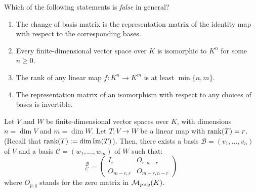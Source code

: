 \begin{exercise}
\label{exc:linear_maps_and_base_changes_sc}
Which of the following statements is \emph{false} in general?
\begin{enumerate}[label=\textbf{(\alph*)}]
    \item The change of basis matrix is the representation matrix of the identity map with respect to the corresponding bases.
    \item Every finite-dimensional vector space over $K$ is isomorphic to $K^n$ for some $n \ge 0$.
    \item The rank of any linear map $f \colon K^n \to K^m$ is at least $\min\{n, m\}$.
    \item The representation matrix of an isomorphism with respect to any choices of bases is invertible.
\end{enumerate}
\end{exercise}

\begin{proposition}
\label{prop:linear_map_normal_form}
Let $V$ and $W$ be finite-di\-men\-sional vector spaces over $K$, with dimensions $n = \dim V$ and $m = \dim W$. Let $T: V \to W$ be a linear map with $\operatorname{rank}(T) = r$. (Recall that $\operatorname{rank}(T) := \dim \operatorname{Im}(T)$). Then, there exists a basis $\mathcal{B} = (v_1, \dots, v_n)$ of $V$ and a basis $\mathcal{C} = (w_1, \dots, w_m)$ of $W$ such that:
\begin{equation*}
    [T]_{\mathcal{C}}^{\mathcal{B}} = \begin{pmatrix} I_r & O_{r, n-r} \\ O_{m-r, r} & O_{m-r, n-r} \end{pmatrix}
\end{equation*}
where $O_{p,q}$ stands for the zero matrix in $\mathcal{M}_{p \times q}(K)$.
\end{proposition}

